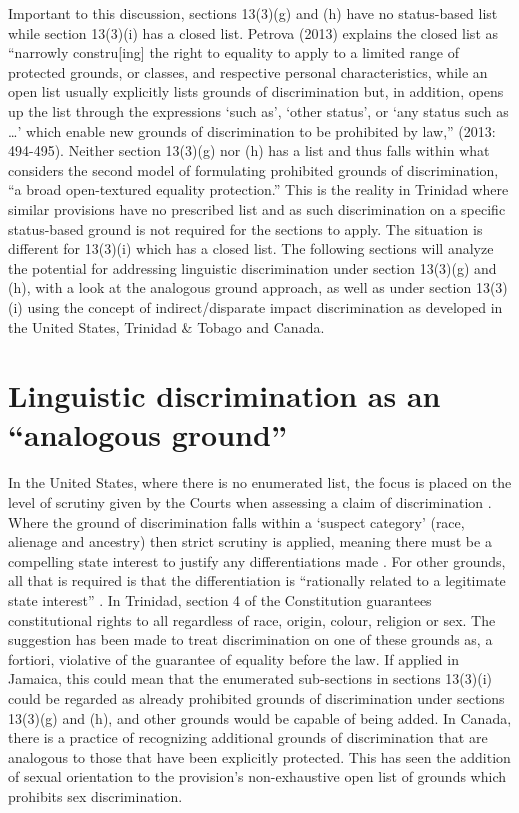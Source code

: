 \documentclass[output=paper,colorlinks,citecolor=brown]{langscibook}
\begin{document}
Important to this discussion, sections 13(3)(g) and (h) have no status-based list while section 13(3)(i) has a closed list. Petrova (2013) explains the closed list as “narrowly constru[ing] the right to equality to apply to a limited range of protected grounds, or classes, and respective personal characteristics, while an open list usually explicitly lists grounds of discrimination but, in addition, opens up the list through the expressions ‘such as’, ‘other status’, or ‘any status such as …’ which enable new grounds of discrimination to be prohibited by law,” (2013: 494-495). Neither section 13(3)(g) nor (h) has a list and thus falls within what \citet{Fredman2011} considers the second model of formulating prohibited grounds of discrimination, “a broad open-textured equality protection.” This is the reality in Trinidad where similar provisions have no prescribed list and as such discrimination on a specific status-based ground is not required for the sections to apply. The situation is different for 13(3)(i) which has a closed list. The following sections will analyze the potential for addressing linguistic discrimination under section 13(3)(g) and (h), with a look at the analogous ground approach, as well as under section 13(3)(i) using the concept of indirect/disparate impact discrimination as developed in the United States, Trinidad \& Tobago and Canada.


\section{Linguistic discrimination as an “analogous ground”}

In the United States, where there is no enumerated list, the focus is placed on the level of scrutiny given by the Courts when assessing a claim of discrimination \citep[118]{Fredman2011}. Where the ground of discrimination falls within a ‘suspect category’ (race, alienage and ancestry) then strict scrutiny is applied, meaning there must be a compelling state interest to justify any differentiations made \citep[120]{Fredman2011}. For other grounds, all that is required is that the differentiation is “rationally related to a legitimate state interest” \citep[118]{Fredman2011}. In Trinidad, section 4 of the Constitution guarantees constitutional rights to all regardless of race, origin, colour, religion or sex. The suggestion has been made to treat discrimination on one of these grounds as, a fortiori, violative of the guarantee of equality before the law. If applied in Jamaica, this could mean that the enumerated sub-sections in sections 13(3)(i) could be regarded as already prohibited grounds of discrimination under sections 13(3)(g) and (h), and other grounds would be capable of being added. In Canada, there is a practice of recognizing additional grounds of discrimination that are analogous to those that have been explicitly protected. This has seen the addition of sexual orientation to the provision’s non-exhaustive open list of grounds which prohibits sex discrimination.
\end{document}
